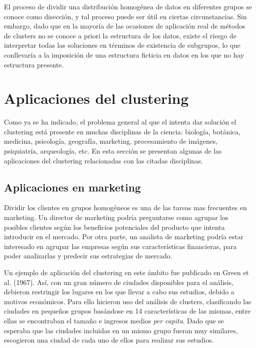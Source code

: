 El proceso de dividir una distribución homogénea de datos en diferentes grupos se conoce como disección, y tal proceso puede ser útil en ciertas circunstancias. Sin embargo, dado que en la mayoría de las ocasiones de aplicación real de métodos de clusters no se conoce a priori la estructura de los datos, existe el riesgo de interpretar todas las soluciones en términos de existencia de subgrupos, lo que conllevaría a la imposición de una estructura ficticia en datos en los que no hay estructura presente.

\section{Aplicaciones del clustering}

Como ya se ha indicado, el problema general al que el intenta dar solución el clustering está presente en muchas disciplinas de la ciencia: biología, botánica, medicina, psicología, geografía, marketing, procesamiento de imágenes, psiquiatría, arqueología, etc. En esta sección se presentan algunas de las aplicaciones del clustering relacionadas con las citadas disciplinas.

\subsection{Aplicaciones en marketing}

Dividir los clientes en grupos homogéneos es una de las tareas mas frecuentes en marketing. Un director de marketing podría preguntarse como agrupar los posibles clientes según los beneficios potenciales del producto que intenta introducir en el mercado. Por otra parte, un analista de marketing podría estar interesado en agrupar las empresas según sus características financieras, para poder analizarlas y predecir sus estrategias de mercado.

Un ejemplo de aplicación del clustering en este ámbito fue publicado en Green et al. (1967). Así, con un gran número de ciudades disponibles para el análisis, debieron restringir los lugares en los que llevar a cabo sus estudios, debido a motivos económicos. Para ello hicieron uso del análisis de clusters, clasificando las ciudades en pequeños grupos basándose en 14 características de las mismas, entre ellas se encontraban el tamaño e ingresos medios \textit{per capita}. Dado que se esperaba que las ciudades incluidas en un mismo grupo fueran muy similares, escogieron una ciudad de cada uno de ellos para realizar sus estudios.

